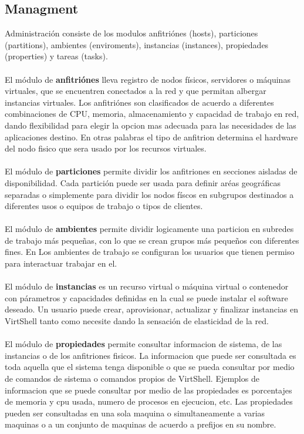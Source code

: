 \subsection{Managment}
Administración consiste de los modulos anfitriónes (hosts), particiones (partitions), ambientes (enviroments), instancias (instances), propiedades (properties) y tareas (tasks). \\
\\
El módulo de \textbf{anfitriónes} lleva registro de nodos físicos, servidores o máquinas virtuales, que se encuentren conectados a la red y que permitan albergar instancias virtuales. Los anfitriónes son clasificados de acuerdo a diferentes combinaciones de CPU, memoria, almacenamiento y capacidad de trabajo en red, dando flexibilidad para elegir la opcion mas adecuada para las necesidades de las aplicaciones destino. En otras palabras el tipo de anfitrion determina el hardware del nodo fisico que sera usado por los recursos virtuales.\\
\\
El módulo de \textbf{particiones} permite dividir los anfitriones en secciones aisladas de disponibilidad. Cada partición puede ser usada para definir aréas geográficas separadas o simplemente para dividir los nodos físcos en subgrupos destinados a diferentes usos o equipos de trabajo o tipos de clientes.\\
\\
El módulo de \textbf{ambientes} permite dividir logicamente una particion en subredes de trabajo más pequeñas, con lo que se crean grupos más pequeños con diferentes fines. En Los ambientes de trabajo se configuran los usuarios que tienen permiso para interactuar trabajar en el.\\
\\
El módulo de \textbf{instancias} es un recurso virtual o máquina virtual o contenedor con párametros y capacidades definidas en la cual se puede instalar el software deseado. Un usuario puede crear, aprovisionar, actualizar y finalizar instancias en VirtShell tanto como necesite dando la sensación de elasticidad de la red.\\
\\
El módulo de \textbf{propiedades} permite consultar informacion de sistema, de las instancias o de los anfitriones fisicos. La informacion que puede ser consultada es toda aquella que el sistema tenga disponible o que se pueda consultar por medio de comandos de sistema o comandos propios de VirtShell. Ejemplos de informacion que se puede consultar por medio de las propiedades es porcentajes de memoria y cpu usada, numero de procesos en ejecucion, etc. Las propiedades pueden ser consultadas en una sola maquina o simultaneamente a varias maquinas o a un conjunto de maquinas de acuerdo a prefijos en su nombre.\\
